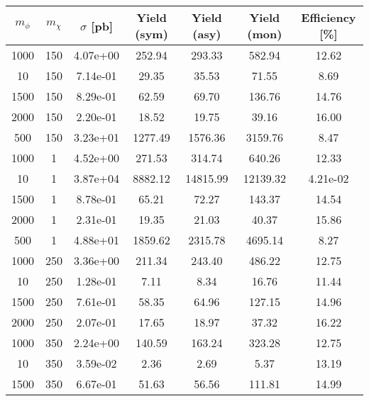 \begin{table}
\footnotesize
\centering
\begin{tabular}{ccccccc}
\hline\hline
$m_\phi$ & $m_\chi$ & $\sigma$ [pb] & Yield (sym) & Yield (asy) & Yield (mon) & Efficiency [\%] \\ \hline
1000      &   150       &   4.07e+00  &   252.94    &   293.33    &   582.94    &   12.62     \\ 
10        &   150       &   7.14e-01  &   29.35     &   35.53     &   71.55     &   8.69      \\ 
1500      &   150       &   8.29e-01  &   62.59     &   69.70     &   136.76    &   14.76     \\ 
2000      &   150       &   2.20e-01  &   18.52     &   19.75     &   39.16     &   16.00     \\ 
500       &   150       &   3.23e+01  &   1277.49   &   1576.36   &   3159.76   &   8.47      \\ 
1000      &   1         &   4.52e+00  &   271.53    &   314.74    &   640.26    &   12.33     \\ 
10        &   1         &   3.87e+04  &   8882.12   &   14815.99  &   12139.32  &   4.21e-02  \\ 
1500      &   1         &   8.78e-01  &   65.21     &   72.27     &   143.37    &   14.54     \\ 
2000      &   1         &   2.31e-01  &   19.35     &   21.03     &   40.37     &   15.86     \\ 
500       &   1         &   4.88e+01  &   1859.62   &   2315.78   &   4695.14   &   8.27      \\ 
1000      &   250       &   3.36e+00  &   211.34    &   243.40    &   486.22    &   12.75     \\ 
10        &   250       &   1.28e-01  &   7.11      &   8.34      &   16.76     &   11.44     \\ 
1500      &   250       &   7.61e-01  &   58.35     &   64.96     &   127.15    &   14.96     \\ 
2000      &   250       &   2.07e-01  &   17.65     &   18.97     &   37.32     &   16.22     \\ 
1000      &   350       &   2.24e+00  &   140.59    &   163.24    &   323.28    &   12.75     \\ 
10        &   350       &   3.59e-02  &   2.36      &   2.69      &   5.37      &   13.19     \\ 
1500      &   350       &   6.67e-01  &   51.63     &   56.56     &   111.81    &   14.99     \\ 

\end{tabular}
\end{table}
